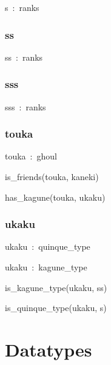 \documentclass{article}
\begin{document}
s~:~ranks

\subsubsection*{ss}

ss~:~ranks

\subsubsection*{sss}

sss~:~ranks

\subsubsection*{touka}

touka~:~ghoul

is\_friends(touka, kaneki)

has\_kagune(touka, ukaku)

\subsubsection*{ukaku}

ukaku~:~quinque\_type

ukaku~:~kagune\_type

is\_kagune\_type(ukaku, ss)

is\_quinque\_type(ukaku, s)

\section*{Datatypes}
\end{document}
